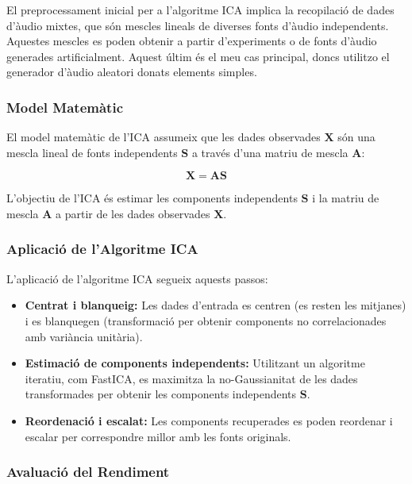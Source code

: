 \documentclass[10pt,a4paper,twocolumn,twoside]{article}
\begin{document}
El preprocessament inicial per a l'algoritme ICA implica la recopilació de dades d'àudio mixtes, que són mescles lineals de diverses fonts d'àudio independents. Aquestes mescles es poden obtenir a partir d'experiments o de fonts d'àudio generades artificialment. Aquest últim és el meu cas principal, doncs utilitzo el generador d'àudio aleatori donats elements simples.

\subsubsection{Model Matemàtic}

El model matemàtic de l'ICA assumeix que les dades observades $\mathbf{X}$ són una mescla lineal de fonts independents $\mathbf{S}$ a través d'una matriu de mescla $\mathbf{A}$:

\begin{equation}
\mathbf{X} = \mathbf{A} \mathbf{S}
\end{equation}

L'objectiu de l'ICA és estimar les components independents $\mathbf{S}$ i la matriu de mescla $\mathbf{A}$ a partir de les dades observades $\mathbf{X}$.

\subsubsection{Aplicació de l'Algoritme ICA}

L'aplicació de l'algoritme ICA segueix aquests passos:

\begin{itemize}
    \item \textbf{Centrat i blanqueig:} Les dades d'entrada es centren (es resten les mitjanes) i es blanquegen (transformació per obtenir components no correlacionades amb variància unitària).
    \item \textbf{Estimació de components independents:} Utilitzant un algoritme iteratiu, com FastICA, es maximitza la no-Gaussianitat de les dades transformades per obtenir les components independents $\mathbf{S}$.
    \item \textbf{Reordenació i escalat:} Les components recuperades es poden reordenar i escalar per correspondre millor amb les fonts originals.
\end{itemize}

\subsubsection{Avaluació del Rendiment}
\end{document}
